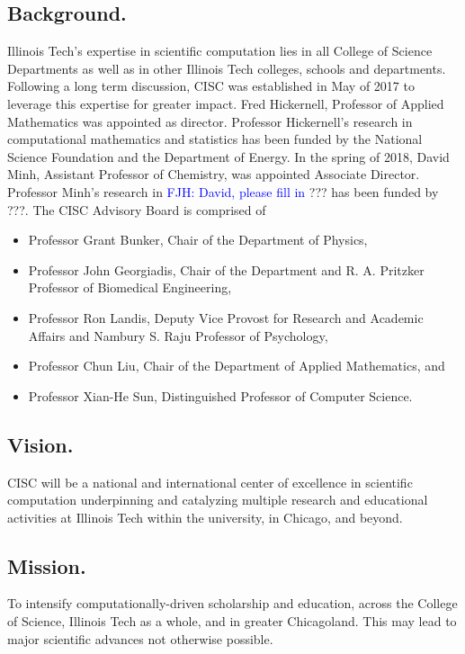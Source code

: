 \documentclass[12pt]{amsart}
\newcommand{\FJHNote}[1]{{\textcolor{blue}{FJH: #1}}}
\begin{document}
\subsection*{Background.} Illinois Tech's expertise in scientific computation lies in all College of Science Departments as well as in other Illinois Tech colleges, schools and departments.  Following a long term discussion, CISC was established in May of 2017 to leverage this expertise for greater impact.  Fred Hickernell, Professor of Applied Mathematics was appointed as director.  Professor Hickernell's research in computational mathematics and statistics has been funded by the National Science Foundation and the Department of Energy.  In the spring of 2018, David Minh, Assistant Professor of Chemistry, was appointed Associate Director.  Professor Minh's research in \FJHNote{David, please fill in} ??? has been funded by ???.  The CISC Advisory Board is comprised of 
\begin{itemize}
    \item Professor Grant Bunker, Chair of the Department of Physics, 
    \item Professor John Georgiadis, Chair of  the Department and R. A. Pritzker Professor of Biomedical Engineering,
    
    \item Professor Ron Landis, Deputy Vice Provost for Research and Academic Affairs and
Nambury S. Raju Professor of Psychology,

    \item Professor Chun Liu, Chair of the Department of Applied Mathematics, and

    \item Professor Xian-He Sun, Distinguished Professor of Computer Science.
\end{itemize}

\subsection*{Vision.}
CISC will be a national and international center of excellence in scientific computation underpinning and catalyzing multiple research and educational activities at Illinois Tech within the university, in Chicago, and beyond.

\subsection*{Mission.}
To intensify computationally-driven scholarship and education, across the College of Science, Illinois Tech as a whole, and in greater Chicagoland.  This may lead to major scientific advances not otherwise possible.
\end{document}

